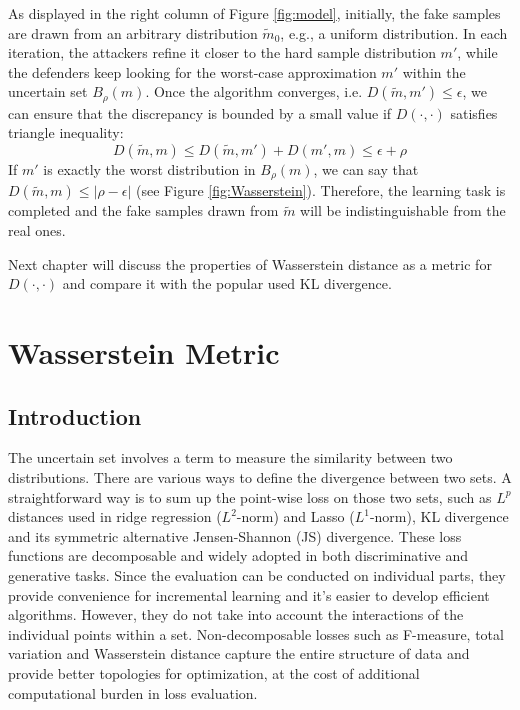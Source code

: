 \documentclass{article}
\begin{document}
As displayed in the right column of Figure \ref{fig:model}, initially, the fake samples are drawn from an arbitrary distribution $\tilde{m}_0$, e.g., a uniform distribution. In each iteration, the attackers refine it closer to the hard sample distribution $m'$, while the defenders keep looking for the worst-case approximation $m'$ within the uncertain set $B_\rho(m)$. Once the algorithm converges, i.e. $D(\tilde{m}, m') \leq \epsilon$, we can ensure that the discrepancy is bounded by a small value if $D(\cdot,\cdot)$ satisfies triangle inequality:
\begin{equation}
D(\tilde{m}, m) \leq D(\tilde{m}, m') + D(m',m) \leq \epsilon + \rho
\end{equation}
If $m'$ is exactly the worst distribution in $B_\rho(m)$, we can say that $D(\tilde{m}, m) \leq |\rho - \epsilon|$ (see Figure \ref{fig:Wasserstein}).
Therefore, the learning task is completed and the fake samples drawn from $\tilde{m}$ will be indistinguishable from the real ones.

Next chapter will discuss the properties of Wasserstein distance as a metric for $D(\cdot,\cdot)$ and compare it with the popular used KL divergence.

\newpage



\section{Wasserstein Metric}
\label{Sec:Wasserstein}

\subsection{Introduction}
The uncertain set involves a term to measure the similarity between two distributions. There are various ways to define the divergence between two sets. A straightforward way is to sum up the point-wise loss on those two sets, such as $L^p$ distances used in ridge regression ($L^2$-norm) and Lasso ($L^1$-norm), KL divergence and its symmetric alternative Jensen-Shannon (JS) divergence. These loss functions are decomposable and widely adopted in both discriminative and generative tasks. Since the evaluation can be conducted on individual parts, they provide convenience for incremental learning and it's easier to develop efficient algorithms. However, they do not take into account the interactions of the individual points within a set. Non-decomposable losses such as F-measure, total variation and Wasserstein distance capture the entire structure of data and provide better topologies for optimization, at the cost of additional computational burden in loss evaluation.
\end{document}
